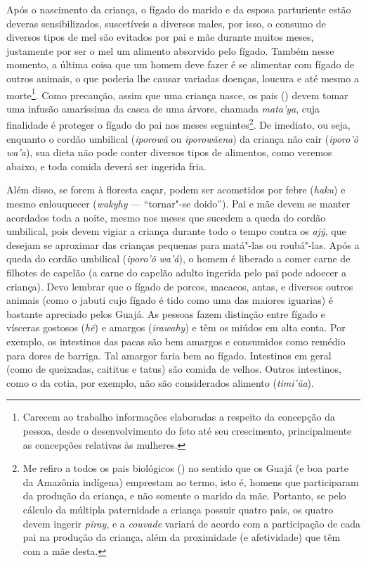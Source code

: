 Após o nascimento da criança, o fígado do marido e da esposa parturiente
estão deveras sensibilizados, suscetíveis a diversos males, por isso, o
consumo de diversos tipos de mel são evitados por pai e mãe durante
muitos meses, justamente por ser o mel um alimento absorvido pelo
fígado. Também nesse momento, a última coisa que um homem deve fazer é
se alimentar com fígado de outros animais, o que poderia lhe causar
variadas doenças, loucura e até mesmo a morte\footnote{Carecem ao
  trabalho informações elaboradas a respeito da concepção da pessoa,
  desde o desenvolvimento do feto até seu crescimento, principalmente as
  concepções relativas às mulheres.}. Como precaução, assim que uma
criança nasce, os pais () devem tomar uma infusão amaríssima da casca
de uma árvore, chamada \emph{mata'ya}, cuja finalidade é proteger o
fígado do pai nos meses seguintes\footnote{Me refiro a todos os pais
  biológicos () no sentido que os Guajá (e boa parte da Amazônia
  indígena) emprestam ao termo, isto é, homens que participaram da
  produção da criança, e não somente o marido da mãe. Portanto, se pelo
  cálculo da múltipla paternidade a criança possuir quatro pais, os
  quatro devem ingerir \emph{piray}, e a \emph{couvade} variará de
  acordo com a participação de cada pai na produção da criança, além da
  proximidade (e afetividade) que têm com a mãe desta.}. De imediato, ou
seja, enquanto o cordão umbilical (\emph{iporowã} ou \emph{iporowãena})
da criança não cair (\emph{iporo'õ} \emph{wa'a}), sua dieta não pode
conter diversos tipos de alimentos, como veremos abaixo, e toda comida
deverá ser ingerida fria.

Além disso, se forem à floresta caçar, podem ser acometidos por febre
(\emph{haku}) e mesmo enlouquecer (\emph{wakyhy} --- ``tornar"-se doido'').
Pai e mãe devem se manter acordados toda a noite, mesmo nos meses que
sucedem a queda do cordão umbilical, pois devem vigiar a criança durante
todo o tempo contra os \emph{ajỹ}, que desejam se aproximar das crianças
pequenas para matá"-las ou roubá"-las. Após a queda do cordão umbilical
(\emph{iporo'õ} \emph{wa'á}), o homem é liberado a comer carne de
filhotes de capelão (a carne do capelão adulto ingerida pelo pai pode
adoecer a criança). Devo lembrar que o fígado de porcos, macacos, antas,
e diversos outros animais (como o jabuti cujo fígado é tido como uma das
maiores iguarias) é bastante apreciado pelos Guajá. As pessoas fazem
distinção entre fígado e vísceras gostosos (\emph{hẽ}) e amargos
(\emph{irawahy}) e têm os miúdos em alta conta. Por exemplo, os
intestinos das pacas são bem amargos e consumidos como remédio para
dores de barriga. Tal amargor faria bem ao fígado. Intestinos em geral
(como de queixadas, caititus e tatus) são comida de velhos. Outros
intestinos, como o da cotia, por exemplo, não são considerados alimento
(\emph{timi'ũa}).

